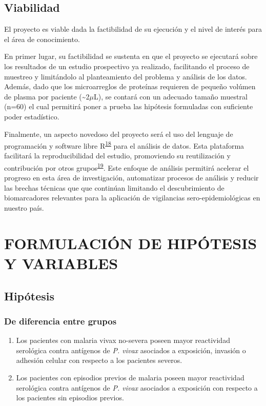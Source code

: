 \documentclass[]{article}
\begin{document}
\subsection{Viabilidad}\label{viabilidad}

El proyecto es viable dada la factibilidad de su ejecución y el nivel de
interés para el área de conocimiento.

En primer lugar, su factibilidad se sustenta en que el proyecto se
ejecutará sobre los resultados de un estudio prospectivo ya realizado,
facilitando el proceso de muestreo y limitándolo al planteamiento del
problema y análisis de los datos. Además, dado que los microarreglos de
proteínas requieren de pequeño volúmen de plasma por paciente
(\textasciitilde{}2\(\mu\)L), se contará con un adecuado tamaño muestral
(n=60) el cual permitirá poner a prueba las hipótesis formuladas con
suficiente poder estadístico.

Finalmente, un aspecto novedoso del proyecto será el uso del lenguaje de
programación y software libre
R\textsuperscript{\protect\hyperlink{ref-R}{18}} para el análisis de
datos. Esta plataforma facilitará la reproducibilidad del estudio,
promoviendo su reutilización y contribución por otros
grupos\textsuperscript{\protect\hyperlink{ref-CienciaReproducible2016}{19}}.
Este enfoque de análisis permitirá acelerar el progreso en esta área de
investigación, automatizar procesos de análisis y reducir las brechas
técnicas que que continúan limitando el descubrimiento de biomarcadores
relevantes para la aplicación de vigilancias sero-epidemiológicas en
nuestro país.

\section{FORMULACIÓN DE HIPÓTESIS Y
VARIABLES}\label{formulacion-de-hipotesis-y-variables}

\subsection{Hipótesis}\label{hipotesis}

\subsubsection{De diferencia entre
grupos}\label{de-diferencia-entre-grupos}

\begin{enumerate}
\def\labelenumi{\arabic{enumi}.}
\item
  Los pacientes con malaria vivax no-severa poseen mayor reactividad
  serológica contra antígenos de \emph{P. vivax} asociados a exposición,
  invasión o adhesión celular con respecto a los pacientes severos.
\item
  Los pacientes con episodios previos de malaria poseen mayor
  reactividad serológica contra antígenos de \emph{P. vivax} asociados a
  exposición con respecto a los pacientes sin episodios previos.
\end{enumerate}
\end{document}
